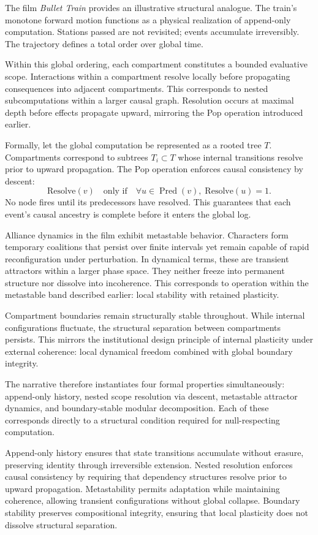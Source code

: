 \documentclass[11pt]{article}
\theoremstyle{remark}
\begin{document}
The film \emph{Bullet Train} provides an illustrative structural analogue. The train’s monotone forward motion functions as a physical realization of append-only computation. Stations passed are not revisited; events accumulate irreversibly. The trajectory defines a total order over global time.

Within this global ordering, each compartment constitutes a bounded evaluative scope. Interactions within a compartment resolve locally before propagating consequences into adjacent compartments. This corresponds to nested subcomputations within a larger causal graph. Resolution occurs at maximal depth before effects propagate upward, mirroring the Pop operation introduced earlier.

Formally, let the global computation be represented as a rooted tree $T$. Compartments correspond to subtrees $T_i \subset T$ whose internal transitions resolve prior to upward propagation. The Pop operation enforces causal consistency by descent:
\[
\text{Resolve}(v)
\quad \text{only if} \quad
\forall u \in \operatorname{Pred}(v), \; \text{Resolve}(u) = 1.
\]
No node fires until its predecessors have resolved. This guarantees that each event’s causal ancestry is complete before it enters the global log.

Alliance dynamics in the film exhibit metastable behavior. Characters form temporary coalitions that persist over finite intervals yet remain capable of rapid reconfiguration under perturbation. In dynamical terms, these are transient attractors within a larger phase space. They neither freeze into permanent structure nor dissolve into incoherence. This corresponds to operation within the metastable band described earlier: local stability with retained plasticity.

Compartment boundaries remain structurally stable throughout. While internal configurations fluctuate, the structural separation between compartments persists. This mirrors the institutional design principle of internal plasticity under external coherence: local dynamical freedom combined with global boundary integrity.

The narrative therefore instantiates four formal properties simultaneously: append-only history, nested scope resolution via descent, metastable attractor dynamics, and boundary-stable modular decomposition. Each of these corresponds directly to a structural condition required for null-respecting computation.

Append-only history ensures that state transitions accumulate without erasure, preserving identity through irreversible extension. Nested resolution enforces causal consistency by requiring that dependency structures resolve prior to upward propagation. Metastability permits adaptation while maintaining coherence, allowing transient configurations without global collapse. Boundary stability preserves compositional integrity, ensuring that local plasticity does not dissolve structural separation.
\end{document}
